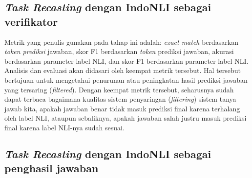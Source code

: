 \subsection{\emph{Task Recasting} dengan IndoNLI sebagai verifikator}
Metrik yang penulis gunakan pada tahap ini adalah: \emph{exact match} berdasarkan \emph{token prediksi} jawaban, skor F1 berdasarkan \emph{token} prediksi jawaban, akurasi berdasarkan parameter label NLI, dan skor F1 berdasarkan parameter label NLI. Analisis dan evaluasi akan didasari oleh keempat metrik tersebut. Hal tersebut bertujuan untuk mengetahui penurunan atau peningkatan hasil prediksi jawaban yang tersaring (\emph{filtered}). Dengan keempat metrik tersebut, seharusnya sudah dapat terbaca bagaimana kualitas sistem penyaringan (\emph{filtering}) sistem tanya jawab kita, apakah jawaban benar tidak masuk prediksi final karena terhalang oleh label NLI, ataupun sebaliknya, apakah jawaban salah justru masuk prediksi final karena label NLI-nya sudah sesuai.

\subsection{\emph{Task Recasting} dengan IndoNLI sebagai penghasil jawaban}
\todo